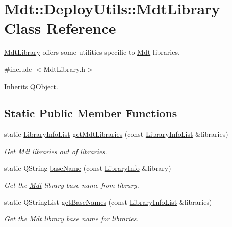 \hypertarget{class_mdt_1_1_deploy_utils_1_1_mdt_library}{}\section{Mdt\+:\+:Deploy\+Utils\+:\+:Mdt\+Library Class Reference}
\label{class_mdt_1_1_deploy_utils_1_1_mdt_library}


\hyperlink{class_mdt_1_1_deploy_utils_1_1_mdt_library}{Mdt\+Library} offers some utilities specific to \hyperlink{namespace_mdt}{Mdt} libraries.  




{\ttfamily \#include $<$Mdt\+Library.\+h$>$}



Inherits Q\+Object.

\subsection*{Static Public Member Functions}
\begin{DoxyCompactItemize}
\item 
static \hyperlink{class_mdt_1_1_deploy_utils_1_1_library_info_list}{Library\+Info\+List} \hyperlink{class_mdt_1_1_deploy_utils_1_1_mdt_library_a2a9174c642445f629e3c2b492e9fa62c}{get\+Mdt\+Libraries} (const \hyperlink{class_mdt_1_1_deploy_utils_1_1_library_info_list}{Library\+Info\+List} \&libraries)\hypertarget{class_mdt_1_1_deploy_utils_1_1_mdt_library_a2a9174c642445f629e3c2b492e9fa62c}{}\label{class_mdt_1_1_deploy_utils_1_1_mdt_library_a2a9174c642445f629e3c2b492e9fa62c}

\begin{DoxyCompactList}\small\item\em Get \hyperlink{namespace_mdt}{Mdt} libraries out of {\itshape libraries}. \end{DoxyCompactList}\item 
static Q\+String \hyperlink{class_mdt_1_1_deploy_utils_1_1_mdt_library_a3d571e370b2a042e2b110a23c0af8d93}{base\+Name} (const \hyperlink{class_mdt_1_1_deploy_utils_1_1_library_info}{Library\+Info} \&library)
\begin{DoxyCompactList}\small\item\em Get the \hyperlink{namespace_mdt}{Mdt} library base name from {\itshape library}. \end{DoxyCompactList}\item 
static Q\+String\+List \hyperlink{class_mdt_1_1_deploy_utils_1_1_mdt_library_ab53bc3075c67efb06a7916d3e41589ea}{get\+Base\+Names} (const \hyperlink{class_mdt_1_1_deploy_utils_1_1_library_info_list}{Library\+Info\+List} \&libraries)
\begin{DoxyCompactList}\small\item\em Get the \hyperlink{namespace_mdt}{Mdt} library base name for {\itshape libraries}. \end{DoxyCompactList}\end{DoxyCompactItemize}


